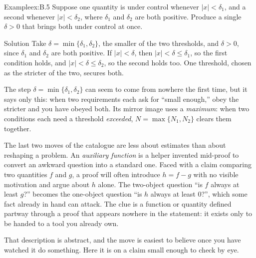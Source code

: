 \documentclass[a4paper,12pt,oneside]{memoir}
\begin{document}
\begin{workedexample}
\begin{envexample}{Example}{ex:B.5}{}
Suppose one quantity is under control whenever \(|x| < \delta_1\), and a second whenever \(|x| < \delta_2\), where \(\delta_1\) and \(\delta_2\) are both positive. Produce a single \(\delta > 0\) that brings both under control at once.
\end{envexample}
\begin{envsolution}{Solution}{}{}
Take \(\delta = \min\{\delta_1, \delta_2\}\), the smaller of the two thresholds, and \(\delta > 0\), since \(\delta_1\) and \(\delta_2\) are both positive. If \(|x| < \delta\), then \(|x| < \delta \le \delta_1\), so the first condition holds, and \(|x| < \delta \le \delta_2\), so the second holds too. One threshold, chosen as the stricter of the two, secures both.

The step \(\delta = \min\{\delta_1, \delta_2\}\) can seem to come from nowhere the first time, but it says only this: when two requirements each ask for “small enough,” obey the stricter and you have obeyed both. Its mirror image uses a \emph{maximum}: when two conditions each need a threshold \emph{exceeded}, \(N = \max\{N_1, N_2\}\) clears them together.
\end{envsolution}
\end{workedexample}
The last two moves of the catalogue are less about estimates than about reshaping a problem. An \emph{auxiliary function} is a helper invented mid-proof to convert an awkward question into a standard one. Faced with a claim comparing two quantities \(f\) and \(g\), a proof will often introduce \(h = f - g\) with no visible motivation and argue about \(h\) alone. The two-object question “is \(f\) always at least \(g\)?” becomes the one-object question “is \(h\) always at least \(0\)?”, which some fact already in hand can attack. The clue is a function or quantity defined partway through a proof that appears nowhere in the statement: it exists only to be handed to a tool you already own.

That description is abstract, and the move is easiest to believe once you have watched it do something. Here it is on a claim small enough to check by eye.
\end{document}
